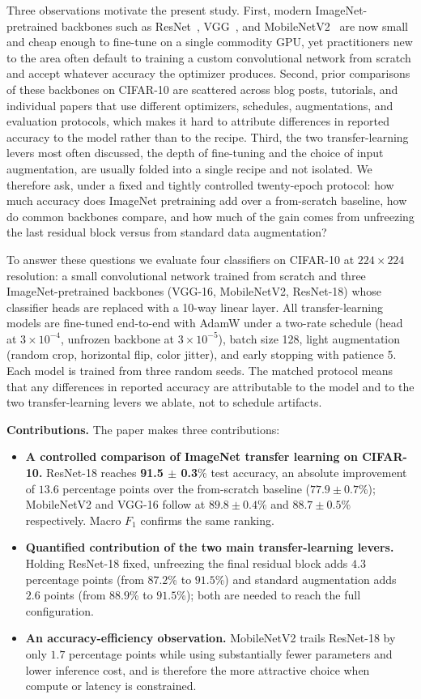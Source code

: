 \documentclass[10pt,twocolumn]{article}
\begin{document}
Three observations motivate the present study. First, modern ImageNet-pretrained backbones such as ResNet~\cite{he2016resnet}, VGG~\cite{simonyan2014vgg}, and MobileNetV2~\cite{sandler2018mobilenetv2} are now small and cheap enough to fine-tune on a single commodity GPU, yet practitioners new to the area often default to training a custom convolutional network from scratch and accept whatever accuracy the optimizer produces. Second, prior comparisons of these backbones on CIFAR-10 are scattered across blog posts, tutorials, and individual papers that use different optimizers, schedules, augmentations, and evaluation protocols, which makes it hard to attribute differences in reported accuracy to the model rather than to the recipe. Third, the two transfer-learning levers most often discussed, the depth of fine-tuning and the choice of input augmentation, are usually folded into a single recipe and not isolated. We therefore ask, under a fixed and tightly controlled twenty-epoch protocol: how much accuracy does ImageNet pretraining add over a from-scratch baseline, how do common backbones compare, and how much of the gain comes from unfreezing the last residual block versus from standard data augmentation?

To answer these questions we evaluate four classifiers on CIFAR-10 at $224 \times 224$ resolution: a small convolutional network trained from scratch and three ImageNet-pretrained backbones (VGG-16, MobileNetV2, ResNet-18) whose classifier heads are replaced with a 10-way linear layer. All transfer-learning models are fine-tuned end-to-end with AdamW under a two-rate schedule (head at $3 \times 10^{-4}$, unfrozen backbone at $3 \times 10^{-5}$), batch size 128, light augmentation (random crop, horizontal flip, color jitter), and early stopping with patience 5. Each model is trained from three random seeds. The matched protocol means that any differences in reported accuracy are attributable to the model and to the two transfer-learning levers we ablate, not to schedule artifacts.

\textbf{Contributions.} The paper makes three contributions:
\begin{itemize}
  \item \textbf{A controlled comparison of ImageNet transfer learning on CIFAR-10.} ResNet-18 reaches \textbf{91.5 $\pm$ 0.3}\% test accuracy, an absolute improvement of $13.6$ percentage points over the from-scratch baseline ($77.9 \pm 0.7$\%); MobileNetV2 and VGG-16 follow at $89.8 \pm 0.4$\% and $88.7 \pm 0.5$\% respectively. Macro $F_1$ confirms the same ranking.
  \item \textbf{Quantified contribution of the two main transfer-learning levers.} Holding ResNet-18 fixed, unfreezing the final residual block adds $4.3$ percentage points (from $87.2$\% to $91.5$\%) and standard augmentation adds $2.6$ points (from $88.9$\% to $91.5$\%); both are needed to reach the full configuration.
  \item \textbf{An accuracy-efficiency observation.} MobileNetV2 trails ResNet-18 by only $1.7$ percentage points while using substantially fewer parameters and lower inference cost, and is therefore the more attractive choice when compute or latency is constrained.
\end{itemize}
\end{document}
